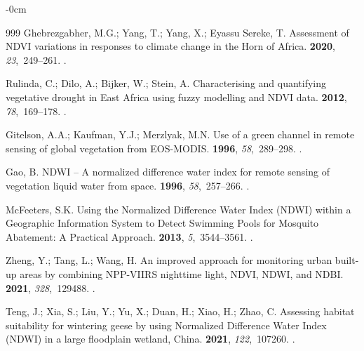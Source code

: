 \documentclass[jimaging,article,accept,pdftex,moreauthors]{Definitions/mdpi}
\begin{document}
\begin{adjustwidth}{-\extralength}{0cm}
\begin{thebibliography}{999}
Ghebrezgabher, M.G.; Yang, T.; Yang, X.; {Eyassu Sereke}, T.
\newblock Assessment of NDVI variations in responses to climate change in the
  Horn of Africa.
 {\bf
  2020}, {\em 23},~249--261.
.

Rulinda, C.; Dilo, A.; Bijker, W.; Stein, A.
\newblock Characterising and quantifying vegetative drought in East Africa
  using fuzzy modelling and NDVI data.
 {\bf 2012}, {\em 78},~169--178.
.

Gitelson, A.A.; Kaufman, Y.J.; Merzlyak, M.N.
\newblock Use of a green channel in remote sensing of global vegetation from
  EOS-MODIS.
 {\bf 1996}, {\em 58},~289--298.
.

Gao, B.
\newblock NDWI -- A normalized difference water index for remote sensing of
  vegetation liquid water from space.
 {\bf 1996}, {\em 58},~257--266.
.

McFeeters, S.K.
\newblock Using the Normalized Difference Water Index (NDWI) within a
  Geographic Information System to Detect Swimming Pools for Mosquito
  Abatement: A Practical Approach.
 {\bf 2013}, {\em 5},~3544--3561.
.

Zheng, Y.; Tang, L.; Wang, H.
\newblock An improved approach for monitoring urban built-up areas by combining
  NPP-VIIRS nighttime light, NDVI, NDWI, and NDBI.
 {\bf 2021}, {\em 328},~129488.
.

Teng, J.; Xia, S.; Liu, Y.; Yu, X.; Duan, H.; Xiao, H.; Zhao, C.
\newblock Assessing habitat suitability for wintering geese by using Normalized
  Difference Water Index (NDWI) in a large floodplain wetland, China.
 {\bf 2021}, {\em 122},~107260.
.


\end{thebibliography}
\end{adjustwidth}
\end{document}
